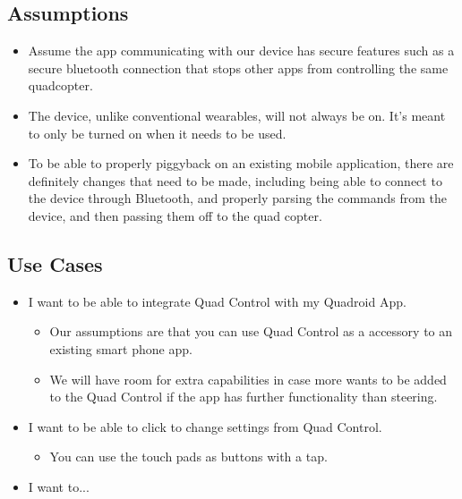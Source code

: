 \documentclass[12pt,letterpaper]{article}
\begin{document}
\subsection*{Assumptions}
\begin{itemize}
\item Assume the app communicating with our device has secure features such as a secure bluetooth connection that stops other apps from controlling the same quadcopter. 
\item The device, unlike conventional wearables, will not always be on. It’s meant to only be turned on when it needs to be used. 
\item To be able to properly piggyback on an existing  mobile application, there are definitely changes that need to be made, including being able to connect to the device through Bluetooth, and properly parsing the commands from the device, and then passing them off to the quad copter.
\end{itemize}

\subsection*{Use Cases}
\begin{itemize}
\item I want to be able to integrate Quad Control with my Quadroid App.
\begin{itemize}
\item Our assumptions are that you can use Quad Control as a accessory to an existing smart phone app.
\item We will have room for extra capabilities in case more wants to be added to the Quad Control if the app has further functionality than steering.
\end{itemize}
\item I want to be able to click to change settings from Quad Control.
\begin{itemize}
\item You can use the touch pads as buttons with a tap.
\end{itemize}
\item I want to...
\end{itemize}
\end{document}
